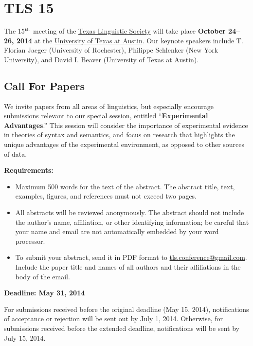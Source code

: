 \documentclass[11pt]{article}
\begin{document}
\clearpage\thispagestyle{empty}

\section*{TLS 15}

The 15$^{\rm th}$ meeting of the \href{http://uts.cc.utexas.edu/~tls}{Texas Linguistic Society} will take place \textbf{October 24--26, 2014} at the \href{https://www.utexas.edu/cola/depts/linguistics/}{University of Texas at Austin}. Our keynote speakers include T. Florian Jaeger (University of Rochester), Philippe Schlenker (New York University), and David I. Beaver (University of Texas at Austin).

\subsection*{Call For Papers}

We invite papers from all areas of linguistics, but especially encourage submissions relevant to our special session, entitled ``\textbf{Experimental Advantages}.''
This session will consider the importance of experimental evidence in theories of syntax and semantics, and focus on research that highlights the unique advantages of the experimental environment, as opposed to other sources of data.

\bigskip\noindent
\textbf{Requirements:}

\begin{itemize}
  \setlength{\itemsep}{2pt}
  \setlength{\parskip}{2pt}
  \item Maximum 500 words for the text of the abstract. The abstract title, text, examples, figures, and references must not exceed two pages.
  \item All abstracts will be reviewed anonymously. The abstract should not include the author’s name, affiliation, or other identifying information; be careful that your name and email are not automatically embedded by your word processor.
  \item To submit your abstract, send it in PDF format to \href{mailto:tls.conference@gmail.com}{tls.conference@gmail.com}. Include the paper title and names of all authors and their affiliations in the body of the email.
\end{itemize}

\textbf{Deadline: May 31, 2014}

\bigskip\noindent
For submissions received before the original deadline (May 15, 2014), notifications of acceptance or rejection will be sent out by July 1, 2014. Otherwise, for submissions received before the extended deadline, notifications will be sent by July 15, 2014.
\end{document}
